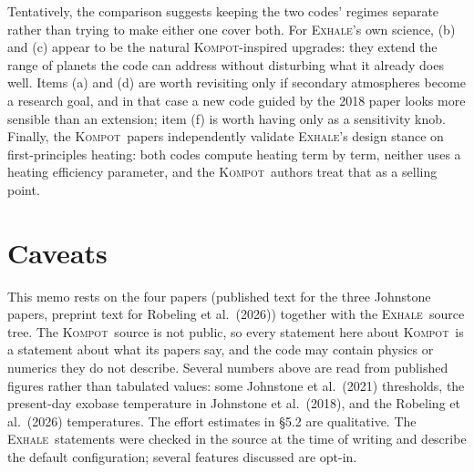 \documentclass{my_memo}
\newcommand{\EXHALE}{\textsc{Exhale}}
\newcommand{\Kompot}{\textsc{Kompot}}
\begin{document}
Tentatively, the comparison suggests keeping the two codes' regimes separate rather than trying to
make either one cover both. For \EXHALE's own science, (b) and (c) appear to be the natural
\Kompot-inspired upgrades: they extend the range of planets the code can address without
disturbing what it already does well. Items (a) and (d) are worth revisiting only if secondary
atmospheres become a research goal, and in that case a new code guided by the 2018 paper looks
more sensible than an extension; item (f) is worth having only as a sensitivity knob. Finally,
the \Kompot\ papers independently validate \EXHALE's design stance on first-principles heating:
both codes compute heating term by term, neither uses a heating efficiency parameter, and the
\Kompot\ authors treat that as a selling point.

\section{Caveats}

This memo rests on the four papers (published text for the three Johnstone papers, preprint
text for Robeling et al.\ (2026)) together with the \EXHALE\ source tree. The \Kompot\ source
is not public, so every statement here about \Kompot\ is a statement about what its papers say,
and the code may contain physics or numerics they do not describe. Several numbers above are read
from published figures rather than tabulated values: some Johnstone et al.\ (2021) thresholds,
the present-day exobase temperature in Johnstone et al.\ (2018), and the Robeling et al.\ (2026)
temperatures. The effort estimates in \S5.2 are qualitative. The \EXHALE\ statements were checked
in the source at the time of writing and describe the default configuration; several features
discussed are opt-in.
\end{document}
